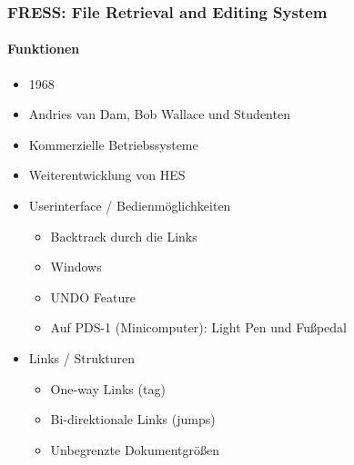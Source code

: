 \begin{frame}
\frametitle{FRESS: File Retrieval and Editing System}
\framesubtitle{Funktionen}
\begin{itemize}
	\item 1968
	\item Andries van Dam, Bob Wallace und Studenten
	\item Kommerzielle Betriebssysteme
	\item Weiterentwicklung von HES
	\item Userinterface / Bedienmöglichkeiten
	\begin{itemize}
		\item Backtrack durch die Links
		\item Windows
		\item UNDO Feature
		\item Auf PDS-1 (Minicomputer): Light Pen und Fußpedal
	\end{itemize}
	\item Links / Strukturen
	\begin{itemize}
		\item One-way Links (tag)
		\item Bi-direktionale Links (jumps)
		\item Unbegrenzte Dokumentgrößen
	\end{itemize}
\end{itemize}
\end{frame}
